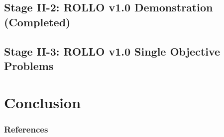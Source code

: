 \documentclass[9pt]{beamer}
\begin{document}
\subsection{Stage II-2: ROLLO v1.0 Demonstration (Completed)}

\subsection{Stage II-3: ROLLO v1.0 Single Objective Problems}


\section{Conclusion}

%
\begin{frame}[allowframebreaks]
  \frametitle{References}
  
  {\footnotesize  }

\end{frame}

\end{document}
